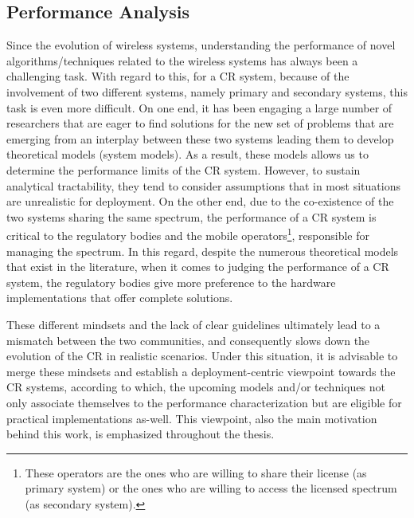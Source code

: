 \subsection{Performance Analysis}
Since the evolution of wireless systems, understanding the performance of novel algorithms/techniques related to the wireless systems has always been a challenging task. With regard to this, for a CR system, because of the involvement of two different systems, namely primary and secondary systems, this task is even more difficult. On one end, it has been engaging a large number of researchers that are eager to find solutions for the new set of problems that are emerging from an interplay between these two systems leading them to develop theoretical models (system models). As a result, these models allows us to determine the performance limits of the CR system. However, to sustain analytical tractability, they tend to consider assumptions that in most situations are unrealistic for deployment.  %
 On the other end, due to the co-existence of the two systems sharing the same spectrum, the performance of a CR system is critical to the regulatory bodies and the mobile operators\footnote{These operators are the ones who are willing to share their license (as primary system) or the ones who are willing to access the licensed spectrum (as secondary system).}, responsible for managing the spectrum. In this regard, despite the numerous theoretical models that exist in the literature, when it comes to judging the performance of a CR system, the regulatory bodies give more preference to the hardware implementations that offer complete solutions. 

These different mindsets and the lack of clear guidelines ultimately lead to a mismatch between the two communities, and consequently slows down the evolution of the CR in realistic scenarios. Under this situation, it is advisable to merge these mindsets and establish a deployment-centric viewpoint towards the CR systems, according to which, the upcoming models and/or techniques not only associate themselves to the performance characterization but are eligible for practical implementations as-well. This viewpoint, also the main motivation behind this work, is emphasized throughout the thesis. 

